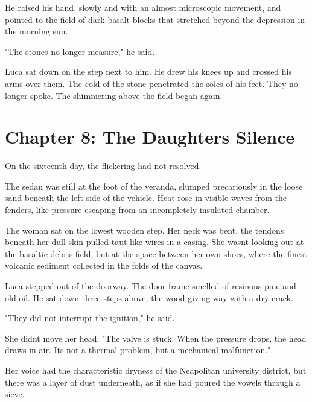\documentclass[
  ngerman,
]{article}
\begin{document}
He raised his hand, slowly and with an almost microscopic movement, and
pointed to the field of dark basalt blocks that stretched beyond the
depression in the morning sun.

"The stones no longer measure," he said.

Luca sat down on the step next to him. He drew his knees up and crossed
his arms over them. The cold of the stone penetrated the soles of his
feet. They no longer spoke. The shimmering above the field began again.

\section{}\label{section-3}

\section{\texorpdfstring{\textbf{Chapter 8: The
Daughter\textquotesingle s
Silence}}{Chapter 8: The Daughter\textquotesingle s Silence}}\label{chapter-8-the-daughters-silence}

On the sixteenth day, the flickering had not resolved.

The sedan was still at the foot of the veranda, slumped precariously in
the loose sand beneath the left side of the vehicle. Heat rose in
visible waves from the fenders, like pressure escaping from an
incompletely insulated chamber.

The woman sat on the lowest wooden step. Her neck was bent, the tendons
beneath her dull skin pulled taut like wires in a casing. She
wasn\textquotesingle t looking out at the basaltic debris field, but at
the space between her own shoes, where the finest volcanic sediment
collected in the folds of the canvas.

Luca stepped out of the doorway. The door frame smelled of resinous pine
and old oil. He sat down three steps above, the wood giving way with a
dry crack.

"They did not interrupt the ignition," he said.

She didn\textquotesingle t move her head. "The valve is stuck. When the
pressure drops, the head draws in air. It\textquotesingle s not a
thermal problem, but a mechanical malfunction."

Her voice had the characteristic dryness of the Neapolitan university
district, but there was a layer of dust underneath, as if she had poured
the vowels through a sieve.
\end{document}
